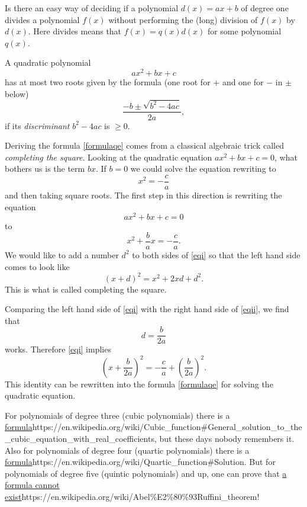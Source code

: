 \documentclass{article}
\begin{document}
\beginshex
Is there an easy way of deciding if a polynomial $d(x) = a x + b$ of degree one divides
a polynomial $f(x)$ without performing the (long) division of $f(x)$ by
$d(x)$. Here divides means that $f(x) = q(x) d(x)$ for some polynomial $q(x)$.
\endshex

A quadratic polynomial
$$
a x^2 + b x + c
$$
has at most two roots given
by the formula (one root for $+$ and one for $-$ in $\pm$ below)
\begin{equation}\label{formulaqe}
\frac{-b\pm \sqrt{b^2 - 4 a c}}{2 a},
\end{equation}
if its \emph{discriminant} $b^2 - 4 a c$ is $\geq 0$.

\begin{frameit}
  Deriving the formula \eqref{formulaqe} comes from a classical algebraic trick called \emph{completing the square}. Looking
  at the quadratic equation $a x^2 + b x + c = 0$, what bothers us is the term $b x$. If $b=0$ we could solve the equation rewriting to
  $$
  x^2 = -\frac{c}{a}
  $$
  and then taking square roots. The first step in this direction is rewriting
  the equation
  $$
  a x^2 + b x + c = 0
  $$
  to
  \begin{equation}\label{eqi}
  x^2 + \frac{b}{a} x = -\frac{c}{a}.
  \end{equation}
  We would like to add a number $d^2$ to both sides of \eqref{eqi} so that the left hand side comes to look like
  \begin{equation}\label{eqii}
    (x + d)^2 = x^2 + 2 x d + d^2.
  \end{equation}
    This is what is called completing the square.

  Comparing the left hand side of \eqref{eqi} with the right hand side of \eqref{eqii}, we find that 
  $$
  d = \frac{b}{2 a}
  $$
  works.
  Therefore \eqref{eqi} implies
  $$
  \left( x + \frac{b}{2a}\right)^2 = -\frac{c}{a} + \left(\frac{b}{2 a}\right)^2.
  $$
  This identity can be rewritten into the formula \eqref{formulaqe} for solving the
  quadratic equation.
  \end{frameit}


For polynomials of degree three (cubic
polynomials) there is a \url{formula}{https://en.wikipedia.org/wiki/Cubic_function#General_solution_to_the_cubic_equation_with_real_coefficients}, but these days nobody remembers it. Also for polynomials of
degree four (quartic polynomials) there is a \url{formula}{https://en.wikipedia.org/wiki/Quartic_function#Solution}. But for polynomials of degree five (quintic polynomials) and up, one can prove
that \url{a formula cannot exist}{https://en.wikipedia.org/wiki/Abel\%E2\%80\%93Ruffini_theorem}!
\end{document}
